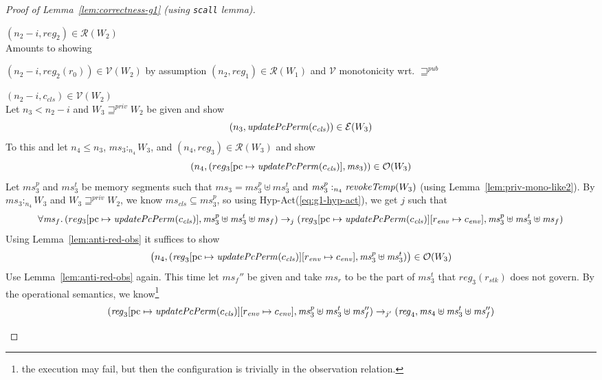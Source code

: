 \documentclass[a4paper]{article}
\newcommand{\update}[2]{[#1 \mapsto #2]}
\newcommand{\var}[1]{\mathit{#1}}
\newcommand{\hs}{\var{ms}}
\newcommand{\ms}{\hs}
\newcommand{\pcreg}{\mathrm{pc}}
\newcommand{\reg}{\var{reg}}
\newcommand{\heap}{\var{mem}}
\newcommand{\stk}{\var{stk}}
\newcommand{\env}{\var{env}}
\newcommand{\cls}{\var{cls}}
\newcommand{\plainfun}[2]{
  \ifthenelse{\equal{#2}{}}
  {\mathit{#1}}
  {\mathit{#1}(#2)}
}
\newcommand{\updatePcPerm}[1]{\plainfun{updatePcPerm}{#1}}
\newcommand{\revokeTemp}[1]{\plainfun{revokeTemp}{#1}}
\newcommand{\futurewk}{\mathbin{\sqsupseteq}^{\var{pub}}}
\newcommand{\futurestr}{\mathbin{\sqsupseteq}^{\var{priv}}}
\newcommand{\heapSat}[3][\heap]{#1 :_{#2} #3}
\newcommand{\memSat}[3][n]{\heapSat[#2]{#1}{#3}}
\newcommand{\asmType}{\plaindom{AsmType}}
\newcommand{\plaindom}[1]{\mathrm{#1}}
\newcommand{\intr}[2]{\mathcal{#1}}
\newcommand{\valueintr}[1]{\intr{V}{#1}}
\newcommand{\exprintr}[1]{\intr{E}{#1}}
\newcommand{\regintr}[1]{\intr{R}{#1}}
\newcommand{\stdvr}{\valueintr{\asmType}}
\newcommand{\stder}{\exprintr{\asmType}}
\newcommand{\stdrr}{\regintr{\asmType}}
\newcommand{\observations}{\mathcal{O}}
\newcommand{\npair}[2][n]{\left(#1,#2 \right)}
\newcommand{\step}[1][]{\rightarrow_{#1}}
\begin{document}
\begin{proof}[Proof of Lemma~\ref{lem:correctness-g1} (using \texttt{scall} lemma)]
\begin{enumproof}[resume]
\begin{enumproof}
\begin{enumproof}
            \item $\npair[n_2-i]{\reg_2} \in \stdrr(W_2)$ \\
              Amounts to showing
              \begin{enumproof}
                \item $\npair[n_2-i]{\reg_2(r_0)} \in \stdvr(W_2)$ by assumption $\npair[n_2]{\reg_1} \in \stdrr(W_1)$ and $\stdvr$ monotonicity wrt. $\futurewk$
                \item $\npair[n_2-i]{c_\cls} \in \stdvr(W_2)$ \\
                  Let $n_3 < n_2 - i$ and $W_3 \futurestr W_2$ be given and show
                  \[
                    \npair[n_3]{\updatePcPerm{c_\cls}} \in \stder(W_3)
                  \]
                  To this and let $n_4 \leq n_3$, $\memSat[n_4]{\ms_3}{W_3}$, and $\npair[n_4]{\reg_3} \in \stdrr(W_3)$ and show
                  \begin{equation}
                    \label{eq:g1-c-cls-obs}
                    \npair[n_4]{(reg_3\update{\pcreg}{\updatePcPerm{c_\cls}},\ms_3)} \in \observations(W_3)
                  \end{equation}
                  Let $\ms_3^p$ and $\ms_3^t$ be memory segments such that $\ms_3 = \ms_3^p \uplus \ms_3^t$ and $\memSat[n_4]{\ms_3^p}{\revokeTemp{W_3}}$ (using Lemma~\ref{lem:priv-mono-like2}). By $\memSat[n_4]{\ms_3}{W_3}$ and $W_3 \futurestr W_2$, we know $\ms_\cls \subseteq \ms_3^p$, so using Hyp-Act(\ref{eq:g1-hyp-act}), we get $j$ such that
                  \[
                    \forall \ms_f \ldotp (reg_3\update{\pcreg}{\updatePcPerm{c_\cls}},\ms_3^p \uplus \ms_3^t \uplus \ms_f) \step[j] (\reg_3\update{\pcreg}{\updatePcPerm{c_\cls}}\update{r_\env}{c_\env},\ms_3^p \uplus \ms_3^t \uplus \ms_f)
                  \]
                  Using Lemma~\ref{lem:anti-red-obs} it suffices to show
                  \[
                    \npair[n_4]{(\reg_3\update{\pcreg}{\updatePcPerm{c_\cls}}\update{r_\env}{c_\env},\ms_3^p \uplus \ms_3^t)} \in \observations(W_3)
                  \]
                  Use Lemma~\ref{lem:anti-red-obs} again. This time let $\ms_f''$ be given and take $\ms_r$ to be the part of $\ms_3^t$ that $\reg_3(r_\stk)$ does not govern. By the operational semantics, we know\footnote{the execution may fail, but then the configuration is trivially in the observation relation.}
                  \[
                    (\reg_3\update{\pcreg}{\updatePcPerm{c_\cls}}\update{r_\env}{c_\env},\ms_3^p \uplus \ms_3^t \uplus \ms_f'') \step[j']
                    (\reg_4,\ms_4 \uplus \ms_3^t \uplus \ms_f'')
\]
\end{enumproof}
\end{enumproof}
\end{enumproof}
\end{enumproof}
\end{proof}
\end{document}

